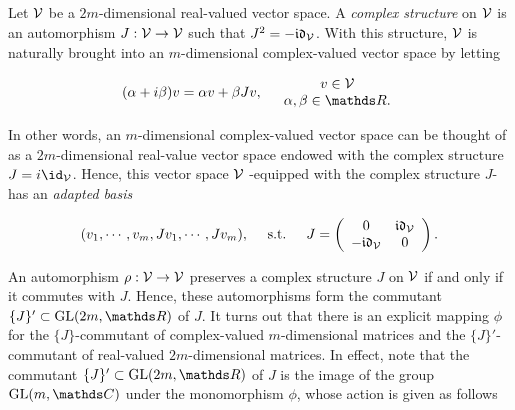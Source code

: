 
\subsection{}

Let $\mathcal{V}$ be a $2m$-dimensional real-valued vector space. A \textit{complex structure} on $\mathcal{V}$ is an automorphism $J : \mathcal{V} \rightarrow \mathcal{V}$ such that $J^2 = - \mathfrak{i}\mathfrak{d}_{\mathcal{V}}$. With this structure, $\mathcal{V}$ is naturally brought into an $m$-dimensional complex-valued vector space by letting 

\begin{equation}
    (\alpha + i\beta) v = \alpha v + \beta J v, \quad \begin{array}{cc}
         v \in \vectorspace  \\
         \alpha, \beta \in \R.
    \end{array}
\end{equation}

In other words, an $m$-dimensional complex-valued vector space can be thought of as a $2m$-dimensional real-value vector space endowed with the complex structure $J = i\id_{\vectorspace}$. 
Hence, this vector space $\mathcal{V}$ -equipped with the complex structure $J$- has an \textit{adapted basis}

\begin{equation}
    (v_1, \cdots, v_m, Jv_1, \cdots, J v_m), \quad \textnormal{ s.t. } \quad J = \left(
        \begin{array}{cc}
            0 & \mathfrak{i}\mathfrak{d}_{\mathcal{V}}  \\
           - \mathfrak{i}\mathfrak{d}_{\mathcal{V}} & 0
        \end{array}
    \right).
\end{equation}

\medbreak

An automorphism $\rho: \mathcal{V} \rightarrow \mathcal{V}$ preserves a complex structure $J$ on $\mathcal{V}$ if and only if it commutes with $J$. Hence, these automorphisms form the commutant $\{J\}' \subset \generallineargroup(2m, \R)$ of $J$. It turns out that there is an explicit mapping $\phi$ for the $\{J\}$-commutant of complex-valued $m$-dimensional matrices and the $\{J\}'$-commutant of real-valued $2m$-dimensional matrices. In effect, note that the commutant $\{J\}' \subset \generallineargroup(2m, \R)$ of $J$ is the image of the group $\generallineargroup(m,\C)$ under the monomorphism $\phi$, whose action is given as follows 

